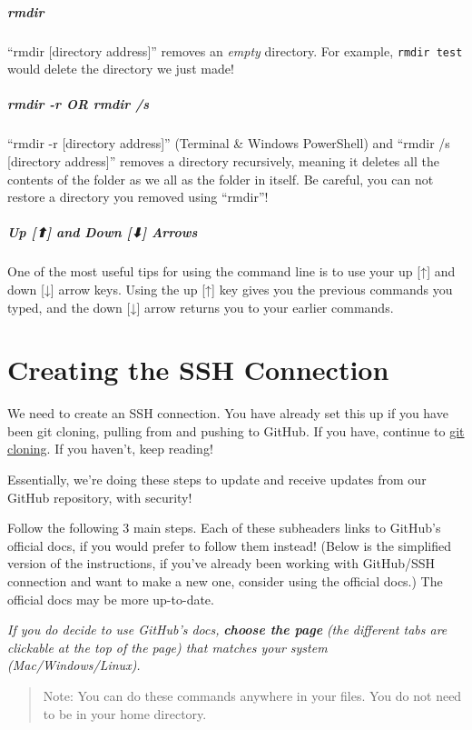 \documentclass[
]{book}
\theoremstyle{definition}
\theoremstyle{definition}
\theoremstyle{definition}
\theoremstyle{definition}
\theoremstyle{remark}
\begin{document}
\subparagraph*{rmdir}\label{rmdir}

``rmdir {[}directory address{]}'' removes an \emph{empty} directory. For example, \texttt{rmdir\ test} would delete the directory we just made!

\subparagraph*{rmdir -r OR rmdir /s}\label{rmdir--r-or-rmdir-s}

``rmdir -r {[}directory address{]}'' (Terminal \& Windows PowerShell) and ``rmdir /s {[}directory address{]}'' removes a directory recursively, meaning it deletes all the contents of the folder as we all as the folder in itself. Be careful, you can not restore a directory you removed using ``rmdir''!

\subparagraph*{Up {[}⬆{]} and Down {[}⬇{]} Arrows}\label{up-and-down-arrows}

One of the most useful tips for using the command line is to use your up {[}↑{]} and down {[}↓{]} arrow keys. Using the up {[}↑{]} key gives you the previous commands you typed, and the down {[}↓{]} arrow returns you to your earlier commands.

\section{Creating the SSH Connection}\label{creating-the-ssh-connection}

We need to create an SSH connection. You have already set this up if you have been git cloning, pulling from and pushing to GitHub. If you have, continue to \hyperref[git-clone]{git cloning}. If you haven't, keep reading!

Essentially, we're doing these steps to update and receive updates from our GitHub repository, with security!

Follow the following 3 main steps. Each of these subheaders links to GitHub's official docs, if you would prefer to follow them instead! (Below is the simplified version of the instructions, if you've already been working with GitHub/SSH connection and want to make a new one, consider using the official docs.) The official docs may be more up-to-date.

\emph{If you do decide to use GitHub's docs,} \textbf{\emph{choose the page}} \emph{(the different tabs are clickable at the top of the page) that matches your system (Mac/Windows/Linux).}

\begin{quote}
Note: You can do these commands anywhere in your files. You do not need to be in your home directory.
\end{quote}
\end{document}
